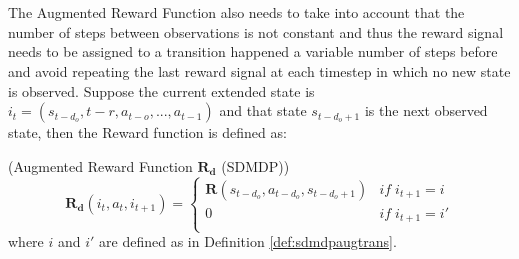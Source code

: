                 \\\\
                The Augmented Reward Function also needs to take into account that the number of steps between observations is not constant and thus the reward signal needs to be assigned to a transition happened a variable number of steps before and avoid repeating the last reward signal at each timestep in which no new state is observed. Suppose the current extended state is $i_t = \left( s_{t-d_o}, t-r, a_{t-o}, ..., a_{t-1} \right)$ and that state $s_{t-d_o+1}$ is the next observed state, then the Reward function is defined as:
                \begin{definition}(Augmented Reward Function $\mathbf{R_d}$ (SDMDP))
                    \label{def:sdmdpaugrew}
                    \[ \mathbf{R_d} \left( i_t, a_t, i_{t+1} \right) =  
                        \begin{cases} 
                            \mathbf{R} \left( s_{t-d_o}, a_{t-d_o}, s_{t-d_o+1} \right) & if \; i_{t+1} = i \\
                            0 & if \; i_{t+1} = i'\\ 
                        \end{cases}
                    \]
                where $i$ and $i'$ are defined as in Definition \ref{def:sdmdpaugtrans}.
                \end{definition}
                

